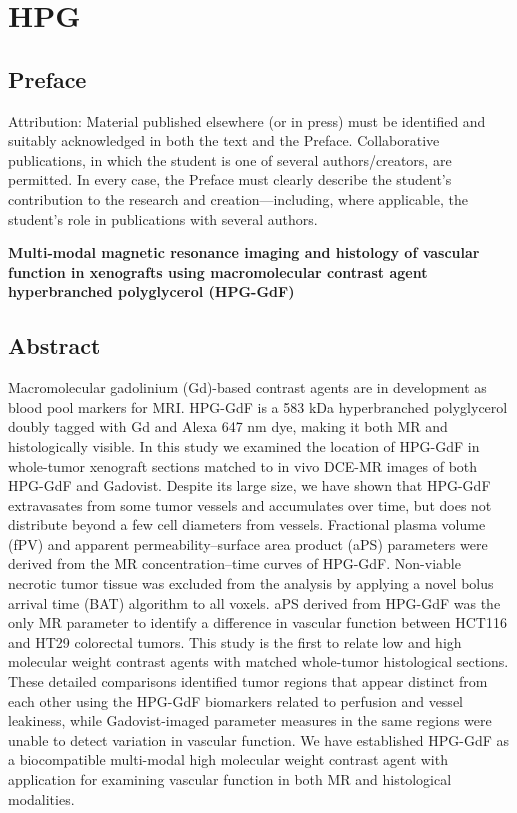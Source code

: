 
\chapter{HPG}
\label{ch:HPG}

\section{Preface}

Attribution: Material published elsewhere (or in press) must be identified and suitably acknowledged in both the text and the Preface.
Collaborative publications, in which the student is one of several authors/creators, are permitted.
In every case, the Preface must clearly describe the student's contribution to the research and creation—including, where applicable, the student's role in publications with several authors.

\textbf{Multi-modal magnetic resonance imaging and histology of vascular function in xenografts using macromolecular contrast agent hyperbranched polyglycerol (HPG-GdF)}

\section{Abstract}

Macromolecular gadolinium (Gd)-based contrast agents are in development as blood pool markers for MRI.
HPG-GdF is a 583 kDa hyperbranched polyglycerol doubly tagged with Gd and Alexa 647 nm dye, making it both MR and histologically visible.
In this study we examined the location of HPG-GdF in whole-tumor xenograft sections matched to in vivo DCE-MR images of both HPG-GdF and Gadovist.
Despite its large size, we have shown that HPG-GdF extravasates from some tumor vessels and accumulates over time, but does not distribute beyond a few cell diameters from vessels.
Fractional plasma volume (fPV) and apparent permeability–surface area product (aPS) parameters were derived from the MR concentration–time curves of HPG-GdF.
Non-viable necrotic tumor tissue was excluded from the analysis by applying a novel bolus arrival time (BAT) algorithm to all voxels.
aPS derived from HPG-GdF was the only MR parameter to identify a difference in vascular function between HCT116 and HT29 colorectal tumors.
This study is the first to relate low and high molecular weight contrast agents with matched whole-tumor histological sections.
These detailed comparisons identified tumor regions that appear distinct from each other using the HPG-GdF biomarkers related to perfusion and vessel leakiness, while Gadovist-imaged parameter measures in the same regions were unable to detect variation in vascular function.
We have established HPG-GdF as a biocompatible multi-modal high molecular weight contrast agent with application for examining vascular function in both MR and histological modalities.

